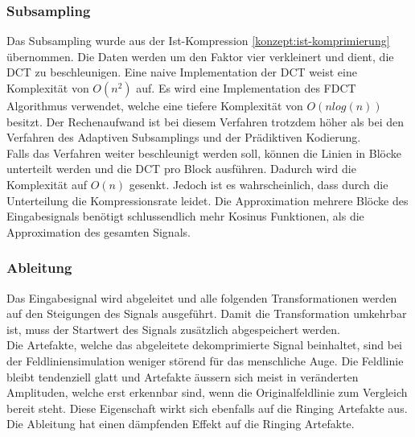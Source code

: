 \subsubsection{Subsampling} \label{konzept:loesung1:subsampling}
Das Subsampling wurde aus der Ist-Kompression \ref{konzept:ist-komprimierung} übernommen. Die Daten werden um den Faktor vier verkleinert und dient, die DCT zu beschleunigen. Eine naive Implementation der DCT weist eine Komplexität von $O(n^2)$ auf. Es wird eine Implementation des FDCT Algorithmus verwendet, welche eine tiefere Komplexität von $O(n log(n))$ besitzt. Der Rechenaufwand ist bei diesem Verfahren trotzdem höher als bei den Verfahren des Adaptiven Subsamplings und der Prädiktiven Kodierung.\\
Falls das Verfahren weiter beschleunigt werden soll, können die Linien in Blöcke unterteilt werden und die DCT pro Block ausführen. Dadurch wird die Komplexität auf $O(n)$ gesenkt. Jedoch ist es wahrscheinlich, dass durch die Unterteilung die Kompressionsrate leidet. Die Approximation mehrere Blöcke des Eingabesignals benötigt schlussendlich mehr Kosinus Funktionen, als die Approximation des gesamten Signals.

\subsubsection{Ableitung}
Das Eingabesignal wird abgeleitet und alle folgenden Transformationen werden auf den Steigungen des Signals ausgeführt. Damit die Transformation umkehrbar ist, muss der Startwert des Signals zusätzlich abgespeichert werden.\\
Die Artefakte, welche das abgeleitete dekomprimierte Signal beinhaltet, sind bei der Feldliniensimulation weniger störend für das menschliche Auge. Die Feldlinie bleibt tendenziell glatt und Artefakte äussern sich meist in veränderten Amplituden, welche erst erkennbar sind, wenn die Originalfeldlinie zum Vergleich bereit steht. Diese Eigenschaft wirkt sich ebenfalls auf die Ringing Artefakte aus. Die Ableitung hat einen dämpfenden Effekt auf die Ringing Artefakte.

